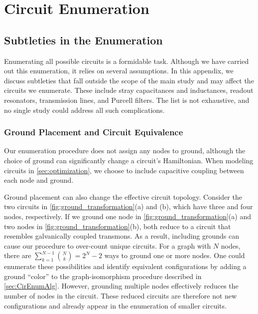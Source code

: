 
\chapter{Circuit Enumeration}\label{apx:chp_enumeration}

\section{Subtleties in the Enumeration}\label{app:subtleties}
Enumerating all possible circuits is a formidable task. Although we have carried out this enumeration, it relies on several assumptions. In this appendix, we discuss subtleties that fall outside the scope of the main study and may affect the circuits we enumerate. These include stray capacitances and inductances, readout resonators, transmission lines, and Purcell filters. The list is not exhaustive, and no single study could address all such complications.

\subsection{Ground Placement and Circuit Equivalence}\label{sec:gnd}
Our enumeration procedure does not assign any nodes to ground, although the choice of ground can significantly change a circuit's Hamiltonian. When modeling circuits in \cref{sec:optimization}, we choose to include capacitive coupling between each node and ground.

Ground placement can also change the effective circuit topology. Consider the two circuits in \cref{fig:ground_transformation}(a) and (b), which have three and four nodes, respectively. If we ground one node in \cref{fig:ground_transformation}(a) and two nodes in \cref{fig:ground_transformation}(b), both reduce to a circuit that resembles galvanically coupled transmons. As a result, including grounds can cause our procedure to over-count unique circuits. For a graph with $N$ nodes, there are
$\sum_{k=1}^{N-1}\binom{N}{k} = 2^N - 2$
ways to ground one or more nodes. One could enumerate these possibilities and identify equivalent configurations by adding a ground ``color'' to the graph-isomorphism procedure described in \cref{sec:CirEnumAlg}. However, grounding multiple nodes effectively reduces the number of nodes in the circuit. These reduced circuits are therefore not new configurations and already appear in the enumeration of smaller circuits.

